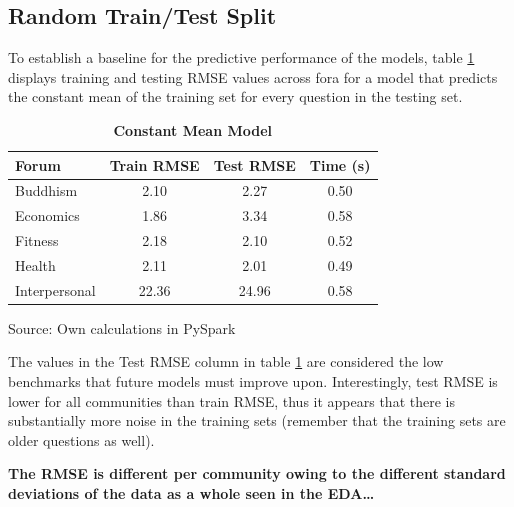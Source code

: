 \documentclass[11pt,preprint, authoryear]{article}
\numberwithin{equation}{section}
\begin{document}
\subsection{Random Train/Test Split}\label{random-traintest-split}

To establish a baseline for the predictive performance of the models,
table \ref{tab:rand_mean_model} displays training and testing RMSE
values across fora for a model that predicts the constant mean of the
training set for every question in the testing set.

\footnotesize

\begin{longtable}[htbp] {@{} lccc @{}} 
\caption{\textbf{Constant Mean Model}} 
\label{tab:rand_mean_model} \\
\toprule
\textbf{Forum} &  \textbf{Train RMSE} &  \textbf{Test RMSE} &  \textbf{Time (s)} \\
\midrule
Buddhism      &                  2.10 &               2.27 &                0.50 \\
Economics     &                  1.86 &               3.34 &                0.58 \\
Fitness       &                  2.18 &               2.10 &                0.52 \\
Health        &                  2.11 &               2.01 &                0.49 \\
Interpersonal &                 22.36 &              24.96 &                0.58 \\
\bottomrule
\end{longtable}\begin{center} Source: Own calculations in PySpark\end{center}

\normalsize

The values in the Test RMSE column in table \ref{tab:rand_mean_model}
are considered the low benchmarks that future models must improve upon.
Interestingly, test RMSE is lower for all communities than train RMSE,
thus it appears that there is substantially more noise in the training
sets (remember that the training sets are older questions as well).

\textbf{The RMSE is different per community owing to the different
standard deviations of the data as a whole seen in the EDA\ldots{}}

\footnotesize
\end{document}

